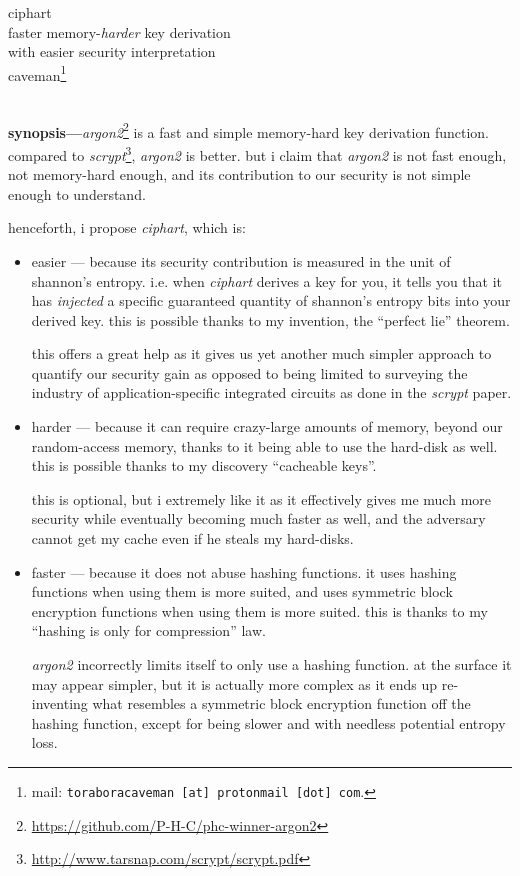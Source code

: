 \documentclass[twocolumn]{article}
\begin{document}
\SetInd{.15em}{1em}

\begin{center}
\Huge
ciphart\\
\Large
faster memory-\emph{harder} key derivation \\
with easier security interpretation\\
\normalsize
caveman\footnote{mail: \texttt{toraboracaveman [at] protonmail [dot]
com}.}\\
\footnotesize
\DTMnow\\
\end{center}

\noindent\textbf{synopsis---}\emph{argon2}\footnote{\url{https://github.com/P-H-C/phc-winner-argon2}}
is a fast and simple memory-hard key derivation function.  compared to
\emph{scrypt}\footnote{\url{http://www.tarsnap.com/scrypt/scrypt.pdf}},
\emph{argon2} is better.  but i claim that \emph{argon2} is not fast
enough, not memory-hard enough, and its contribution to our security is not
simple enough to understand.

henceforth, i propose \emph{ciphart}, which is:
\begin{itemize}
    \item easier --- because its security contribution is measured in the
    unit of shannon's entropy.  i.e. when \emph{ciphart} derives a key for
    you, it tells you that it has \emph{injected} a specific guaranteed
    quantity of shannon's entropy bits into your derived key.  this is
    possible thanks to my invention, the ``perfect lie'' theorem.

    this offers a great help as it gives us yet another much simpler
    approach to quantify our security gain as opposed to being limited to
    surveying the industry of application-specific integrated circuits as
    done in the \emph{scrypt} paper.

    \item harder --- because it can require crazy-large amounts of memory,
    beyond our random-access memory, thanks to it being able to use the
    hard-disk as well.  this is possible thanks to my discovery ``cacheable
    keys''.

    this is optional, but i extremely like it as it effectively gives me
    much more security while eventually becoming much faster as well, and
    the adversary cannot get my cache even if he steals my hard-disks.

    \item faster --- because it does not abuse hashing functions.  it uses
    hashing functions when using them is more suited, and uses symmetric
    block encryption functions when using them is  more suited.  this is
    thanks to my ``hashing is only for compression'' law.

    \emph{argon2} incorrectly limits itself to only use a hashing function.
    at the surface it may appear simpler, but it is actually more complex
    as it ends up re-inventing what resembles a symmetric block encryption
    function off the hashing function, except for being slower and with
    needless potential entropy loss.
\end{itemize}
\end{document}
